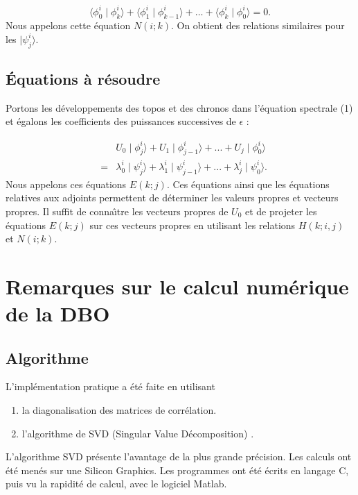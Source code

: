 \documentclass{book}
\begin{document}
\begin{equation}\langle \phi^{i}_{0}\mid \phi^{i}_{k}\rangle +\langle
\phi^{i}_{1}\mid \phi^{i}_{k-1}\rangle +\ldots+\langle
\phi^{i}_{k}\mid \phi^{i}_{0}\rangle =0.
\end{equation} 
Nous appelons cette \'equation $N(i;k)$. On obtient des relations
similaires pour les $ \mid 
\psi^{i}_{j}\rangle $. 



\subsection{\'Equations \`a r\'esoudre}

Portons les d\'eveloppements des topos et des chronos dans l'\'equation
spectrale (1) et \'egalons les coefficients des puissances successives
de $\epsilon$ : 


\begin{eqnarray}
&&U_{0}\mid \phi^{i}_{j}\rangle +U_{1}\mid \phi^{i}_{j-1}\rangle +...+U_{j}\mid \phi^{i}_{0}\rangle \nonumber\\
&=&\lambda_{0}^{i}\mid \psi^{i}_{j}\rangle +\lambda_{1}^{i}\mid \psi^{i}_{j-1}\rangle +...+\lambda_{j}^{i}\mid \psi^{i}_{0}\rangle.  \label{oivj}
\end{eqnarray}
Nous appelons ces \'equations $E(k;j)$.
Ces \'equations ainsi que les \'equations relatives aux adjoints
permettent de d\'eterminer les valeurs propres et vecteurs propres.
Il suffit de conna\^\i tre les vecteurs propres de $U_0$ et de projeter
les \'equations $E(k;j)$ sur ces vecteurs propres en utilisant les
relations  $H(k;i,j)$ et $N(i;k)$.






\section{Remarques sur le calcul num\'erique de la DBO}
\subsection{Algorithme}
L'impl\'ementation pratique a \'et\'e faite en utilisant 
\begin{enumerate}
\item la diagonalisation des matrices de corr\'elation.
\item l'algorithme de SVD  
(Singular Value D\'ecomposition) \cite{Press92}.
\end{enumerate}
L'algorithme SVD pr\'esente l'avantage de la plus grande pr\'ecision.
Les calculs ont \'et\'e men\'es sur une Silicon Graphics. 
Les programmes ont \'et\'e
\'ecrits en langage C, puis vu la rapidit\'e de calcul, avec le logiciel
Matlab. 
\end{document}

